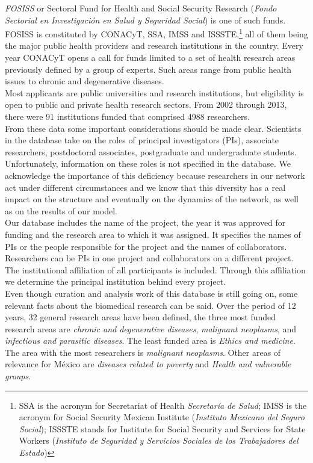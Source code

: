 \documentclass[11pt]{article}
\begin{document}
\emph{FOSISS} or Sectoral Fund for Health and Social Security Research
(\emph{Fondo Sectorial en Investigaci\'on en Salud y Seguridad Social}) is one of
such funds. FOSISS is constituted by CONACyT, SSA, IMSS and ISSSTE,\footnote{SSA
  is the acronym for Secretariat of Health \emph{Secretar\'ia de Salud}; IMSS is
  the acronym for Social Security Mexican Institute (\emph{Instituto Mexicano
    del Seguro Social}); ISSSTE stands for Institute for Social Security and
  Services for State Workers (\emph{Instituto de Seguridad y Servicios Sociales
    de los Trabajadores del Estado})} all of them being the major public health
providers and research institutions in the country. Every year CONACyT opens a
call for funds limited to a set of health research areas previously defined by a
group of experts. Such areas range from public health issues to chronic and
degenerative diseases.\\  

Most applicants are public universities and research institutions, but
eligibility is open to public and private health research sectors.
From 2002 through 2013, there were 91 institutions funded that
comprised 4988 researchers.\\

From these data some important considerations should be made
clear. Scientists in the database take on the roles of principal
investigators (PIs), associate researchers, postdoctoral associates,
postgraduate and undergraduate students.
Unfortunately, information on these roles is not specified in the database.
We acknowledge the importance of this deficiency because
researchers in our network act under different circumstances and we know
that this diversity has a real impact on the structure and eventually on the
dynamics of the network, as well as on the results of our model.\\  

Our database includes the
name of the project, the year it was approved for funding and the research area
to which it was assigned. It specifies the names of PIs or the people 
responsible for the project and the names of collaborators.
Researchers can be PIs in one project and collaborators on a different project. The institutional
affiliation of all participants is included. Through this affiliation
we determine the principal institution
behind every project.\\ 

Even though curation and analysis work of this database is still going on, some
relevant facts about the biomedical research can be said. Over the period of 12
years, 32 general research areas have been defined, the three most funded
research areas are \emph{chronic and degenerative diseases}, \emph{malignant
  neoplasms}, and \emph{infectious and parasitic diseases}. The least funded
area is \emph{Ethics and medicine}. The area with the most researchers is
\emph{malignant neoplasms}. Other areas of relevance for M\'exico are
\emph{diseases related to poverty} and \emph{Health and vulnerable groups}. \\  
\end{document}
